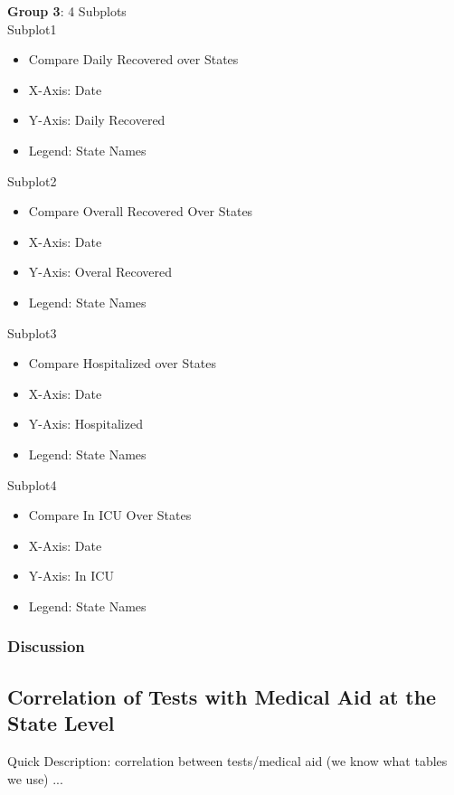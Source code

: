\documentclass[11pt]{article}
\begin{document}
\pagebreak

\noindent
\textbf{Group 3}: 4 Subplots \\

\noindent
Subplot1
\begin{itemize}
    \item Compare Daily Recovered over States
    \item X-Axis: Date
    \item Y-Axis: Daily Recovered
    \item Legend: State Names
\end{itemize}

\noindent
Subplot2
\begin{itemize}
    \item Compare Overall Recovered Over States
    \item X-Axis: Date
    \item Y-Axis: Overal Recovered
    \item Legend: State Names
\end{itemize}

\noindent
Subplot3
\begin{itemize}
    \item Compare Hospitalized over States
    \item X-Axis: Date
    \item Y-Axis: Hospitalized
    \item Legend: State Names
\end{itemize}

\noindent
Subplot4
\begin{itemize}
    \item Compare In ICU Over States
    \item X-Axis: Date
    \item Y-Axis: In ICU
    \item Legend: State Names
\end{itemize}

\subsubsection{Discussion}

\pagebreak

\subsection{Correlation of Tests with Medical Aid at the State Level}

\noindent
Quick Description: correlation between tests/medical aid (we know what tables we use) ...
\end{document}
